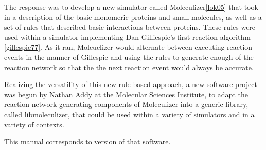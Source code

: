 The response was to develop a new simulator called
Moleculizer\ref{lok05} that took in a description of the basic
monomeric proteins and small molecules, as well as a set of rules that
described basic interactions between proteins. These rules were used
within a simulator implementing Dan Gilliespie's first reaction
algorithm \ref{gillespie77}.  As it ran, Moleuclizer would alternate
between executing reaction events in the manner of Gillespie and using
the rules to generate enough of the reaction network so that the
 the next reaction event would always be accurate.

Realizing the versatility of this new rule-based approach, a new
software project was begun by Nathan Addy at the Molecular Sciences
Institute, to adapt the reaction network generating components of
Moleculizer into a generic library, called libmoleculizer, that could
be used within a variety of simulators and in a variety of contexts.

This manual corresponds to version \currentversion of that software. 
